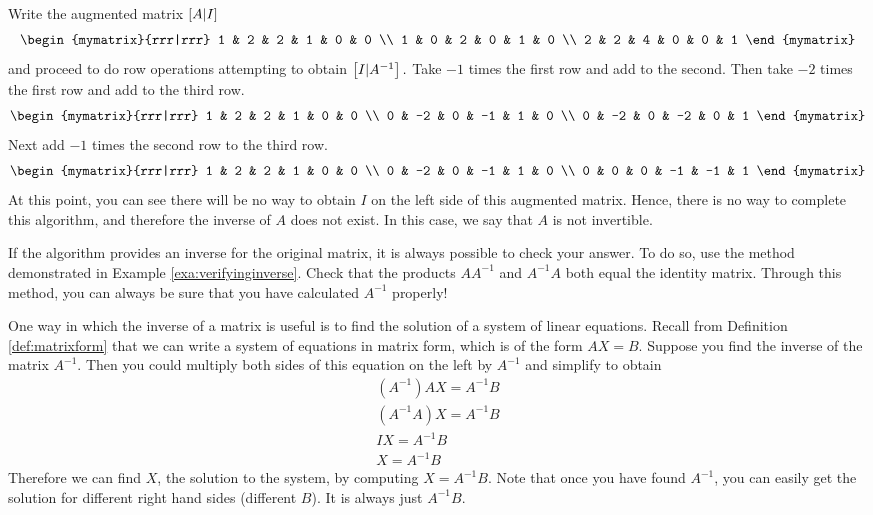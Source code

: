 \begin{solution} Write the augmented matrix $\left[A|I\right] $
\begin{equation*}
\begin{mymatrix}{rrr|rrr}
1 & 2 & 2 & 1 & 0 & 0 \\
1 & 0 & 2 & 0 & 1 & 0 \\
2 & 2 & 4 & 0 & 0 & 1
\end{mymatrix}
\end{equation*}
and proceed to do row operations attempting to obtain $\left[
I|A^{-1}\right] .$ Take $-1$ times the first row and add to the
second. Then take $ -2 $ times the first row and add to the
third row.
\begin{equation*}
\begin{mymatrix}{rrr|rrr}
1 & 2 & 2 & 1 & 0 & 0 \\
0 & -2 & 0 & -1 & 1 & 0 \\
0 & -2 & 0 & -2 & 0 & 1
\end{mymatrix}
\end{equation*}
Next add $-1 $ times the second row to the third row.
\begin{equation*}
\begin{mymatrix}{rrr|rrr}
1 & 2 & 2 & 1 & 0 & 0 \\
0 & -2 & 0 & -1 & 1 & 0 \\
0 & 0 & 0 & -1 & -1 & 1
\end{mymatrix}
\end{equation*}
At this point, you can see there will be no way to obtain $I$ on the
left side of this augmented matrix.  Hence, there is no way to
complete this algorithm, and therefore the inverse of $A$ does not
exist. In this case, we say that $A$ is not invertible.
\end{solution}

If the algorithm provides an inverse for the original matrix, it is always possible to check your answer.
To do so, use the method demonstrated in Example \ref{exa:verifyinginverse}. Check that the products $AA^{-1}$ and $A^{-1}A$ both equal the 
identity matrix. Through this method, you can always be sure that you have calculated $A^{-1}$ properly!

One way in which the inverse of a matrix is useful is to find the solution of a system of linear equations.
Recall from Definition \ref{def:matrixform} that we can write a system of equations in matrix form, 
which is of the form $AX=B$. Suppose you find the
inverse of the matrix $A^{-1}$. Then you could multiply both sides of this
equation on the left by $A^{-1}$ and simplify to obtain
\begin{equation*}
\begin{array}{c}
\left( A^{-1} \right) AX =A^{-1}B \\
\left(A^{-1}A\right) X = A^{-1}B \\
IX = A^{-1}B \\
X = A^{-1}B
\end{array}
\end{equation*}
Therefore we can find $X$, the solution to the system, by computing $X=A^{-1}B$. 
Note that once you
have found $A^{-1}$, you can easily get the solution for different right
hand sides (different $B$). It is always just $A^{-1}B$. 
 

